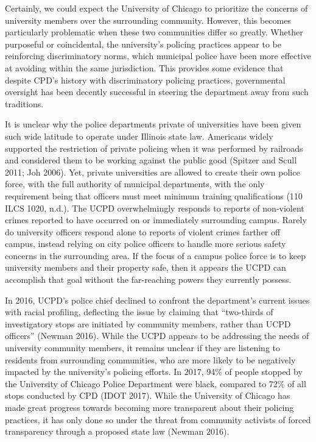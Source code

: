 \documentclass{ucetd}
\begin{document}
Certainly, we could expect the University of Chicago to prioritize the
concerns of university members over the surrounding community. However,
this becomes particularly problematic when these two communities differ
so greatly. Whether purposeful or coincidental, the university's
policing practices appear to be reinforcing discriminatory norms, which
municipal police have been more effective at avoiding within the same
jurisdiction. This provides some evidence that despite CPD's history
with discriminatory policing practices, governmental oversight has been
decently successful in steering the department away from such
traditions.

It is unclear why the police departments private of universities have
been given such wide latitude to operate under Illinois state law.
Americans widely supported the restriction of private policing when it
was performed by railroads and considered them to be working against the
public good (Spitzer and Scull 2011; Joh 2006). Yet, private
universities are allowed to create their own police force, with the full
authority of municipal departments, with the only requirement being that
officers must meet minimum training qualifications (110 ILCS 1020,
n.d.). The UCPD overwhelmingly responds to reports of non-violent crimes
reported to have occurred on or immediately surrounding campus. Rarely
do university officers respond alone to reports of violent crimes
farther off campus, instead relying on city police officers to handle
more serious safety concerns in the surrounding area. If the focus of a
campus police force is to keep university members and their property
safe, then it appears the UCPD can accomplish that goal without the
far-reaching powers they currently possess.

In 2016, UCPD's police chief declined to confront the department's
current issues with racial profiling, deflecting the issue by claiming
that ``two-thirds of investigatory stops are initiated by community
members, rather than UCPD officers'' (Newman 2016). While the UCPD
appears to be addressing the needs of university community members, it
remains unclear if they are listening to residents from surrounding
communities, who are more likely to be negatively impacted by the
university's policing efforts. In 2017, 94\% of people stopped by the
University of Chicago Police Department were black, compared to 72\% of
all stops conducted by CPD (IDOT 2017). While the University of Chicago
has made great progress towards becoming more transparent about their
policing practices, it has only done so under the threat from community
activists of forced transparency through a proposed state law (Newman
2016).
\end{document}
